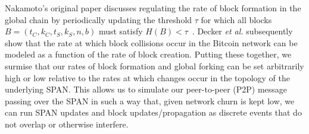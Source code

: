 Nakamoto's original paper discusses regulating the rate of block formation in
the global chain by
periodically updating the threshold $\tau$ for which all blocks
$B=(t_C, k_C, t_S, k_S, n, b)$ must satisfy $H(B)<\tau$~\cite{nakamoto2008bitcoin}.
Decker \textit{et al.} subsequently show that the rate at which block collisions
occur in the Bitcoin network can be modeled as a function of the rate of block
creation. Putting these together, we surmise that our rates of block formation
and global forking can be set arbitrarily high or low relative to the rates at
which changes occur in the topology of the underlying SPAN. This allows us to
simulate our peer-to-peer (P2P) message passing over the SPAN in such
a way that, given network churn is kept low, we can run SPAN updates and
block updates/propagation as discrete events that do not overlap or otherwise
interfere.

